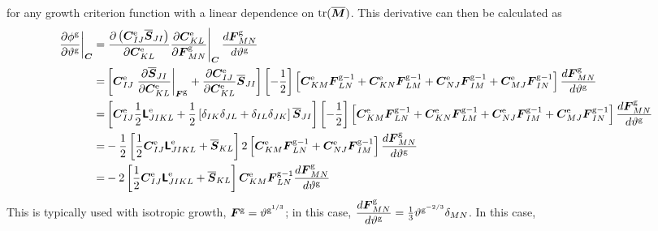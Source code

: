 \documentclass[10pt,letterpaper,oneside]{report}
\newcommand{\ten}[1]{\mbox{\boldmath $#1$}{}}
\newcommand{\tenf}[1]{\mbox{{\sffamily{\bfseries {#1}}}}}
\newcommand{\scas}[1]{\mbox{{\scriptsize{${\rm{#1}}$}}}{}}
\newcommand{\tens}[1]{\mbox{\boldmath{\scriptsize{$#1$}}}{}}
\begin{document}
for any growth criterion function with a linear dependence on $\text{tr} ( \overline{\ten{M}} )$.  This derivative can then be calculated as 
\begin{align}
\left. \frac{\partial \phi^{\scas{g}}}{\partial \vartheta^{\scas{g}}} \right|_{\tens{C}}
=& \left. \frac{ \partial \left( \ten{C}^{\scas{e}}_{IJ} \overline{\ten{S}}_{JI} \right)}{\partial \ten{C}^{\scas{e}}_{KL} } \frac{ \partial \ten{C}^{\scas{e}}_{KL} }{ \partial \ten{F}^{\scas{g}}_{MN} } \right|_{\tens{C}} \frac{ d \ten{F}^{\scas{g}}_{MN} }{ d \vartheta^{\scas{g}} }
\notag \\
=& \left[ \ten{C}^{\scas{e}}_{IJ} \left. \frac{ \partial \overline{\ten{S}}_{JI} }{\partial \ten{C}^{\scas{e}}_{KL} } \right|_{\tens{F}^{\scas{g}}} + \frac{ \partial \ten{C}^{\scas{e}}_{IJ} }{\partial \ten{C}^{\scas{e}}_{KL} } \overline{\ten{S}}_{JI} \right] \left[ - \frac{1}{2} \right] \left[ \ten{C}^{\scas{e}}_{KM} \ten{F}^{\scas{g}-1}_{LN} + \ten{C}^{\scas{e}}_{KN} \ten{F}^{\scas{g}-1}_{LM} + \ten{C}^{\scas{e}}_{NJ} \ten{F}^{\scas{g}-1}_{IM} + \ten{C}^{\scas{e}}_{MJ} \ten{F}^{\scas{g}-1}_{IN} \right] \frac{ d \ten{F}^{\scas{g}}_{MN} }{ d \vartheta^{\scas{g}} }
\notag \\
=& \left[ \ten{C}^{\scas{e}}_{IJ} \frac{1}{2} \tenf{L}^{\scas{e}}_{JIKL} + \frac{1}{2} \left[ \delta_{IK} \delta_{JL} + \delta_{IL} \delta_{JK} \right] \overline{\ten{S}}_{JI} \right] \left[ - \frac{1}{2} \right] \left[ \ten{C}^{\scas{e}}_{KM} \ten{F}^{\scas{g}-1}_{LN} + \ten{C}^{\scas{e}}_{KN} \ten{F}^{\scas{g}-1}_{LM} + \ten{C}^{\scas{e}}_{NJ} \ten{F}^{\scas{g}-1}_{IM} + \ten{C}^{\scas{e}}_{MJ} \ten{F}^{\scas{g}-1}_{IN} \right] \frac{ d \ten{F}^{\scas{g}}_{MN} }{ d \vartheta^{\scas{g}} }
\notag \\
=& - \frac{1}{2} \left[ \frac{1}{2} \ten{C}^{\scas{e}}_{IJ} \tenf{L}^{\scas{e}}_{JIKL} + \overline{\ten{S}}_{KL} \right] 2 \left[ \ten{C}^{\scas{e}}_{KM} \ten{F}^{\scas{g}-1}_{LN} + \ten{C}^{\scas{e}}_{NJ} \ten{F}^{\scas{g}-1}_{IM} \right] \frac{ d \ten{F}^{\scas{g}}_{MN} }{ d \vartheta^{\scas{g}} }
\notag \\
=& - 2 \left[ \frac{1}{2} \ten{C}^{\scas{e}}_{IJ} \tenf{L}^{\scas{e}}_{JIKL} + \overline{\ten{S}}_{KL} \right] \ten{C}^{\scas{e}}_{KM} \ten{F}^{\scas{g}-1}_{LN} \frac{ d \ten{F}^{\scas{g}}_{MN} }{ d \vartheta^{\scas{g}} }
\end{align}
This is typically used with isotropic growth, $\ten{F}^{\scas{g}} = \vartheta^{\scas{g}^{1/3}}$; in this case, $\dfrac{ d \ten{F}^{\scas{g}}_{MN} }{ d \vartheta^{\scas{g}} } = \frac{1}{3} \vartheta^{\scas{g}^{-2/3}} \delta_{MN}$.  In this case, 
\end{document}
